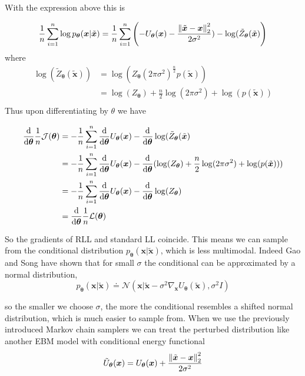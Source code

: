 With the expression above this is

\[
	\frac{1}{n} \sum_{i=1}^n \log p_{\bm{\theta}}(\bm{x} | \tilde{\bm{x}}) 
	= \frac{1}{n} \sum_{i=1}^n \left ( - U_{\bm{\theta}} (\bm{x}) - \frac{ \left\lVert\tilde{\bm{x}} - \bm{x}\right\rVert_{2}^2 }{ 2 \sigma^2 }) - \log(\tilde{Z}_{\bm{\theta}} (\tilde{\bm{x}}) \right)
\]
where
\[
\begin{aligned}
	\log(\tilde{Z}_{\bm{\theta}} (\tilde{\bm{x}}) )
	&= \log( Z_{\bm{\theta}} (2\pi \sigma^2)^{ \frac{n}{2} } p(\tilde{\bm{x}})) \\
	&= \log( Z_{\bm{\theta}}) + \frac{n}{2}\log(2\pi \sigma^2) + \log( p(\tilde{\bm{x}})) \\
\end{aligned}
\]
Thus upon differentiating by $\theta$ we have

\[
\begin{aligned}
	\frac{\dif}{\dif \bm{\theta} } \frac{1}{n} \mathcal{J}(\bm{\theta})
	&= - \frac{1}{n} \sum_{i=1}^n \frac{\dif}{\dif \bm{\theta} } U_{\bm{\theta}} (\bm{x}) - \frac{\dif}{\dif \bm{\theta} } \log(\tilde{Z}_{\bm{\theta}} (\tilde{\bm{x}}) \\
	&= - \frac{1}{n} \sum_{i=1}^n \frac{\dif}{\dif \bm{\theta} } U_{\bm{\theta}} (\bm{x}) 
		- \frac{\dif}{\dif \bm{\theta} } ( \log( Z_{\bm{\theta}}) + \frac{n}{2}\log(2\pi \sigma^2) + \log( p(\tilde{\bm{x}})) ) \\
	&= - \frac{1}{n} \sum_{i=1}^n \frac{\dif}{\dif \bm{\theta} } U_{\bm{\theta}} (\bm{x}) - \frac{\dif}{\dif \bm{\theta} } \log( Z_{\bm{\theta}})  \\
	&= \frac{\dif}{\dif \bm{\theta} } \frac{1}{n} \mathcal{L}(\bm{\theta})  \\
\end{aligned}
\]

So the gradients of RLL and standard LL coincide. 
This means we can sample from the conditional distribution $p_{\bm{\theta}}(\bm{x} | \tilde{\bm{x}})$, which is less multimodal.
Indeed Gao and Song have shown that for small $\sigma$ the conditional can be approximated by a normal distribution,
\[
	p_{\bm{\theta}}(\bm{x} | \tilde{\bm{x}}) \doteq \mathcal{N} \left( \bm{x} | \tilde{\bm{x}} - \sigma^2 \nabla_{\bm{x}} U_{\bm{\theta}} (\tilde{\bm{x}}) , \sigma^2 I \right)
\]

so the smaller we choose $\sigma$, the more the conditional resembles a shifted normal distribution, which is much easier to sample from.
When we use the previously introduced Markov chain samplers we can treat the perturbed distribution like another EBM model with conditional energy functional
\[
	\tilde{U}_{\bm{\theta}} (\bm{x}) = U_{\bm{\theta}} (\bm{x}) + \frac{ \left\lVert\tilde{\bm{x}} - \bm{x}\right\rVert_{2}^2 }{ 2 \sigma^2 }
\]

